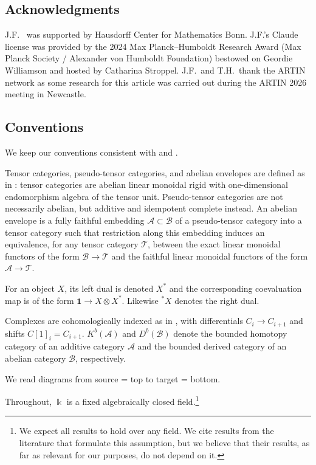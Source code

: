 \documentclass[11pt,oneside]{amsart}
\theoremstyle{definition}
\theoremstyle{remark}
\newcommand\kk{\Bbbk}
\newcommand\cA{\mathcal A}
\newcommand\cB{\mathcal B}
\newcommand\cT{\mathcal T}
\renewcommand\o\otimes
\renewcommand\:\colon
\newcommand\one{\mathbf 1}
\begin{document}
\subsection*{Acknowledgments} J.F.~ was supported by Hausdorff Center for Mathematics Bonn. J.F.'s Claude license was provided by the 2024 Max Planck--Humboldt Research Award (Max Planck Society / Alexander von Humboldt Foundation) bestowed on Geordie William\-son and hosted by Catharina Stroppel. J.F.~and T.H.~thank the ARTIN network as some research for this article was carried out during the ARTIN 2026 meeting in Newcastle.

\subsection*{Conventions}
We keep our conventions consistent with \cite{CEOP} and \cite{FG}.

Tensor categories, pseudo-tensor categories, and abelian envelopes are defined as in \cite{CEOP}: tensor categories are abelian linear monoidal rigid with one-dimensional endomorphism algebra of the tensor unit. Pseudo-tensor categories are not necessarily abelian, but additive and idempotent complete instead. An abelian envelope is a fully faithful embedding $\cA\subset\cB$ of a pseudo-tensor category into a tensor category such that restriction along this embedding induces an equivalence, for any tensor category $\cT$, between the exact linear monoidal functors of the form $\cB\to\cT$ and the faithful linear monoidal functors of the form $\cA\to\cT$.

For an object $X$, its left dual is denoted $X^*$ and the corresponding coevaluation map is of the form $\one\to X\o X^*$. Likewise $^*X$ denotes the right dual.

Complexes are cohomologically indexed as in \cite{FG}, with differentials $C_i\to C_{i+1}$ and shifts $C[1]_i=C_{i+1}$. $K^b(\cA)$ and $D^b(\cB)$ denote the bounded homotopy category of an additive category $\cA$ and the bounded derived category of an abelian category $\cB$, respectively.

We read diagrams from source = top to target = bottom.


Throughout, $\kk$ is a fixed algebraically closed field.\footnote{We expect all results to hold over any field. We cite results from the literature that formulate this assumption, but we believe that their results, as far as relevant for our purposes, do not depend on it.} 
\end{document}
